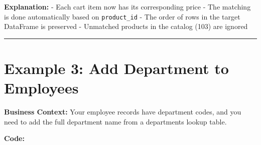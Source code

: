 \documentclass[
  letterpaper,
]{scrbook}
\begin{document}
\textbf{Explanation:} - Each cart item now has its corresponding price -
The matching is done automatically based on \texttt{product\_id} - The
order of rows in the target DataFrame is preserved - Unmatched products
in the catalog (103) are ignored

\begin{center}\rule{0.5\linewidth}{0.5pt}\end{center}

\section{Example 3: Add Department to
Employees}\label{example-3-add-department-to-employees}

\textbf{Business Context:} Your employee records have department codes,
and you need to add the full department name from a departments lookup
table.

\textbf{Code:}
\end{document}
